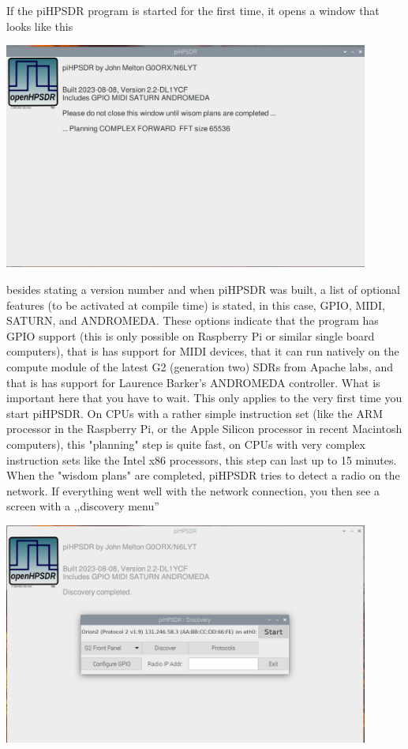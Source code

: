 \documentclass[12pt]{book}
\begin{document}
\newpage
If the piHPSDR program is started for the first time, it opens a window that looks like this

\begin{center}
\includegraphics[width=12cm]{Planning.png}
\end{center}

besides stating a version number and when piHPSDR was built, a list of optional features (to be activated
at compile time) is stated, in this case, GPIO, MIDI, SATURN, and ANDROMEDA. These options indicate
that the program has GPIO support (this is only possible on Raspberry Pi or similar single board computers),
that is has support for MIDI devices, that it can run natively on the compute module of the latest
G2 (generation two) SDRs from Apache labs, and that is has support for Laurence Barker's ANDROMEDA controller.
What is important here that you have to wait. This only applies to the very first time you start piHPSDR.
On CPUs with a rather simple instruction set (like the ARM processor in the Raspberry Pi, or the Apple
Silicon processor in recent Macintosh computers), this "planning" step is quite fast, on CPUs with very
complex instruction sets like the Intel x86 processors, this step can last up to 15 minutes. When the
"wisdom plans" are completed, piHPSDR tries to detect a radio on the network. If everything went well with
the network connection, you then see a screen with a ,,discovery menu''

\begin{center}
\includegraphics[width=12cm]{Start.png}
\end{center}
\end{document}
